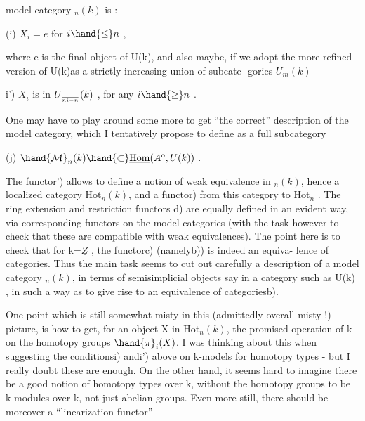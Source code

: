 
model category $_n(k)$ is :

(i) \qquad $X_i = e$ \quad for \quad $i \hand{\leq} n$ \quad ,

where e is the final object of U(k), and also maybe, if we adopt the
more refined version of U(k)\deleted{,}as a strictly increasing union of subcate-%
gories $U_m(k)$\hand{,}

\hand{(}i') \qquad $X_i$ is in $U_{\over{n}{i}-n}(k)$ , for any $i \hand{\geq} n$ \quad .

One may have to play around some more to get ``the correct'' description
of the model category,  which I tentatively propose to define  as
a  full subcategory

(j) \qquad $\hand{\mathcal{M}}_n(k) \hand{\subset} \underline{\mathrm{Hom}}(A^{\mathrm{o}}, U(k))$ \quad .

The functor\hand{(}') allows to define a notion of weak equivalence in
$_n(k)$, hence a localized category Hot$_n(k)$, and a functor\hand{(}) from
this category to Hot$_n$ . The ring extension and restriction functors
\hand{(}d) are equally defined in an evident way, via corresponding functors
on the model categories (with the task however to check that these
are compatible with weak equivalences). The  point here is to
check that for k=$\underline{Z}$ , the functor\hand{(}c) (namely\hand{(}b)) is indeed an equiva-%
lence of categories. Thus the main task seems to cut out carefully a
description of a model category $_n(k)$, in terms of semisimplicial
objects say in a category such as U(k) , in such a way as to give rise
to an equivalence of categories\hand{(}b).

One point which is still somewhat misty in this (admittedly overall
misty !) picture, is how to get, for an object X in Hot$_n(k)$, the
promised operation of k on the homotopy groups $\hand{\pi}_i(X)$. I was thinking
about this when suggesting the conditions\hand{(}i) and\hand{(}i') above on k-models
for homotopy types - but I really doubt these are enough. On the
other hand, it seems hard to imagine  there be a good notion
of homotopy types over k, without the homotopy groups to be k-modules
over k, not just abelian groups. Even more still, there should be
moreover a ``linearization functor''

